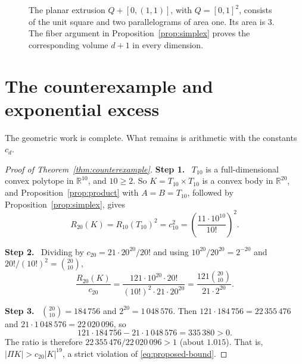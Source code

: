 \documentclass[11pt]{article}
\newcommand{\R}{\mathbb R}
\newcommand{\step}[1]{\par\smallskip\noindent\textbf{#1}\ }
\begin{document}
\begin{figure}[tb]
\centering
{}
\caption{The planar extrusion \(Q+[0,(1,1)]\), with
\(Q=[0,1]^2\), consists of the unit square and two parallelograms of
area one. Its area is \(3\). The fiber argument in
Proposition~\ref{prop:simplex} proves the corresponding volume \(d+1\)
in every dimension.}
\label{fig:extrusion}
\end{figure}

\section{The counterexample and exponential excess}\label{sec:counterexample}

The geometric work is complete. What remains is arithmetic with the
constants \(c_d\).

\begin{proof}[Proof of Theorem~\ref{thm:counterexample}]
\step{Step 1.} \(T_{10}\) is a full-dimensional convex polytope in
\(\R^{10}\), and \(10\ge2\). So \(K=T_{10}\times T_{10}\) is a convex body
in \(\R^{20}\), and Proposition~\ref{prop:product} with \(A=B=T_{10}\),
followed by Proposition~\ref{prop:simplex}, gives
\[
 R_{20}(K)=R_{10}(T_{10})^2=c_{10}^2
         =\left(\frac{11\cdot10^{10}}{10!}\right)^2.
\]

\step{Step 2.} Dividing by \(c_{20}=21\cdot20^{20}/20!\) and using
\(10^{20}/20^{20}=2^{-20}\) and \(20!/(10!)^2=\binom{20}{10}\),
\[
 \frac{R_{20}(K)}{c_{20}}
 =\frac{121\cdot10^{20}\cdot20!}
        {(10!)^2\cdot21\cdot20^{20}}
 =\frac{121\binom{20}{10}}{21\cdot2^{20}}.
\]

\step{Step 3.} \(\binom{20}{10}=184\,756\) and \(2^{20}=1\,048\,576\).
Then \(121\cdot184\,756=22\,355\,476\) and
\(21\cdot1\,048\,576=22\,020\,096\), so
\[
 121\cdot184\,756-21\cdot1\,048\,576=335\,380>0.
\]
The ratio is therefore \(22\,355\,476/22\,020\,096>1\) (about \(1.015\)).
That is, \(|\Pi K|>c_{20}|K|^{19}\), a strict violation of
\eqref{eq:proposed-bound}.
\end{proof}
\end{document}
